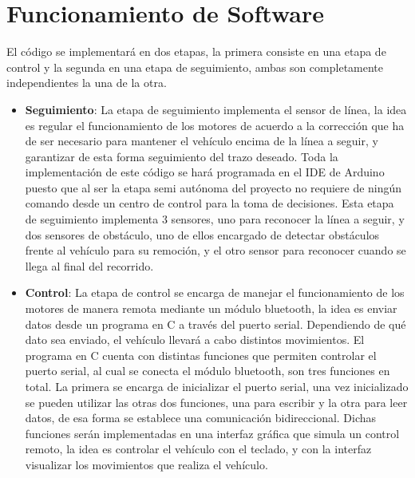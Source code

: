 \section{Funcionamiento de Software}

El código se implementará en dos etapas, la primera consiste en una etapa de control y la segunda en una etapa de seguimiento, ambas son completamente independientes la una de la otra.

\begin{itemize}
    \item \textbf{Seguimiento}: La etapa de seguimiento implementa el sensor de línea, la idea es regular el funcionamiento de los motores de acuerdo a la corrección que ha de ser necesario para mantener el vehículo encima de la línea a seguir, y garantizar de esta forma seguimiento del trazo deseado. Toda la implementación de este código se hará programada en el IDE de Arduino puesto que al ser la etapa semi autónoma del proyecto no requiere de ningún comando desde un centro de control para la toma de decisiones. 
    Esta etapa de seguimiento implementa 3 sensores, uno para reconocer la línea a seguir, y dos sensores de obstáculo, uno de ellos encargado de detectar obstáculos frente al vehículo para su remoción, y el otro sensor para reconocer cuando se llega al final del recorrido.
    
    \item \textbf{Control}: La etapa de control se encarga de manejar el funcionamiento de los motores de manera remota mediante un módulo bluetooth, la idea es enviar datos desde un programa en C a través del puerto serial. Dependiendo de qué dato sea enviado, el vehículo llevará a cabo distintos movimientos. El programa en C cuenta con distintas funciones que permiten controlar el puerto serial, al cual se conecta el módulo bluetooth, son tres funciones en total. La primera se encarga de inicializar el puerto serial, una vez inicializado se pueden utilizar las otras dos funciones, una para escribir y la otra para leer datos, de esa forma se establece una comunicación bidireccional. Dichas funciones serán implementadas en una interfaz gráfica que simula un control remoto, la idea es controlar el vehículo con el teclado, y con la interfaz visualizar los movimientos que realiza el vehículo.
\end{itemize}




